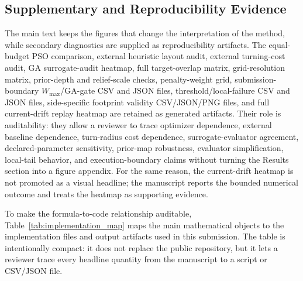 \documentclass[jmse,article,submit,moreauthors]{Definitions/mdpi}
\begin{document}
\subsection{Supplementary and Reproducibility Evidence}
The main text keeps the figures that change the interpretation of the method, while secondary diagnostics are supplied as reproducibility artifacts. The equal-budget PSO comparison, external heuristic layout audit, external turning-cost audit, GA surrogate-audit heatmap, full target-overlap matrix, grid-resolution matrix, prior-depth and relief-scale checks, penalty-weight grid, submission-boundary \(W_{\max}\)/GA-gate CSV and JSON files, threshold/local-failure CSV and JSON files, side-specific footprint validity CSV/JSON/PNG files, and full current-drift replay heatmap are retained as generated artifacts. Their role is auditability: they allow a reviewer to trace optimizer dependence, external baseline dependence, turn-radius cost dependence, surrogate-evaluator agreement, declared-parameter sensitivity, prior-map robustness, evaluator simplification, local-tail behavior, and execution-boundary claims without turning the Results section into a figure appendix. For the same reason, the current-drift heatmap is not promoted as a visual headline; the manuscript reports the bounded numerical outcome and treats the heatmap as supporting evidence.

To make the formula-to-code relationship auditable, Table~\ref{tab:implementation_map} maps the main mathematical objects to the implementation files and output artifacts used in this submission. The table is intentionally compact: it does not replace the public repository, but it lets a reviewer trace every headline quantity from the manuscript to a script or CSV/JSON file.
\end{document}
